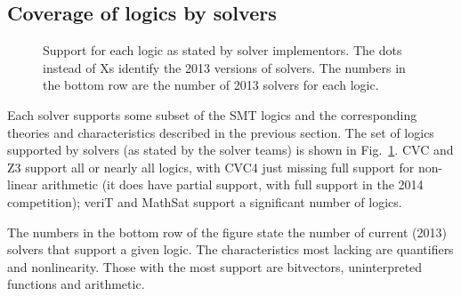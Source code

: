 \documentclass{eptcs}
\begin{document}

\subsection{Coverage of logics by solvers}
\label{Coverage}

\begin{figure}

\centering
\resizebox{\columnwidth}{!}{

}

\caption{Support for each logic as stated by solver implementors. The dots instead of Xs identify the 2013 versions of solvers. The numbers in the bottom row are the number of 2013 solvers for each logic.}
\label{Fig:solversupport}
\end{figure}

Each solver supports some subset of the SMT logics and the corresponding theories and characteristics described in the previous section. The set of logics supported by solvers (as stated by the solver teams) is shown in Fig.~\ref{Fig:solversupport}. CVC and Z3 support all or nearly all logics, with CVC4 just missing full support for non-linear arithmetic (it does have partial support, with full support in the 2014 competition); veriT and MathSat support a significant number of logics.

The numbers in the bottom row of the figure state the number of current (2013) solvers that support a given logic. The characteristics most lacking are quantifiers and nonlinearity. Those with the most support are bitvectors, uninterpreted functions and arithmetic.
\end{document}
